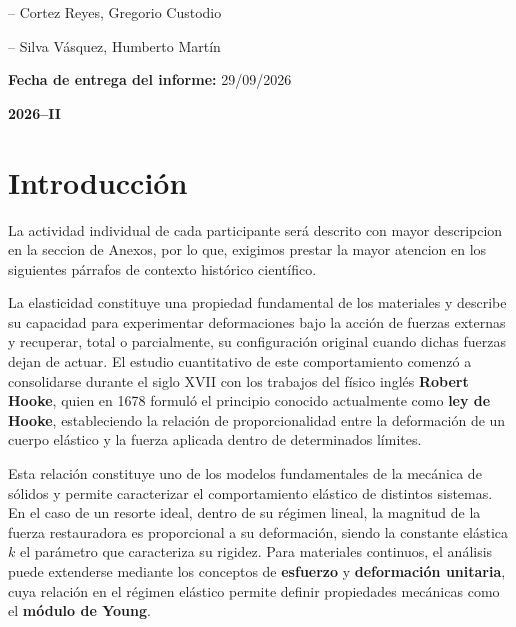 \documentclass[11pt,a4paper]{article}
\begin{document}
\begin{titlepage}
{-- Cortez Reyes, Gregorio Custodio
\vspace{0.20cm}
\hspace{0.6cm}

-- Silva Vásquez, Humberto Martín
}

\vspace{0.95cm}
{\large
\textbf{Fecha de entrega del informe:}
\hspace{0.40cm}
29/09/2026
}

\vspace{1.15cm}
\begin{center}
{\huge\bfseries
2026--II}

\end{center}

\end{titlepage}

\tableofcontents

\newpage
\pagestyle{fancy}

\section{Introducción}

La actividad individual de cada participante será descrito con mayor descripcion en la seccion de Anexos, por lo que, exigimos prestar la mayor atencion en los siguientes párrafos de contexto histórico científico. 

La elasticidad constituye una propiedad fundamental de los materiales y describe su capacidad para experimentar deformaciones bajo la acción de fuerzas externas y recuperar, total o parcialmente, su configuración original cuando dichas fuerzas dejan de actuar. El estudio cuantitativo de este comportamiento comenzó a consolidarse durante el siglo XVII con los trabajos del físico inglés \textbf{Robert Hooke}, quien en 1678 formuló el principio conocido actualmente como \textbf{ley de Hooke}, estableciendo la relación de proporcionalidad entre la deformación de un cuerpo elástico y la fuerza aplicada dentro de determinados límites.

Esta relación constituye uno de los modelos fundamentales de la mecánica de sólidos y permite caracterizar el comportamiento elástico de distintos sistemas. En el caso de un resorte ideal, dentro de su régimen lineal, la magnitud de la fuerza restauradora es proporcional a su deformación, siendo la constante elástica $k$ el parámetro que caracteriza su rigidez. Para materiales continuos, el análisis puede extenderse mediante los conceptos de \textbf{esfuerzo} y \textbf{deformación unitaria}, cuya relación en el régimen elástico permite definir propiedades mecánicas como el \textbf{módulo de Young}.
\end{document}
